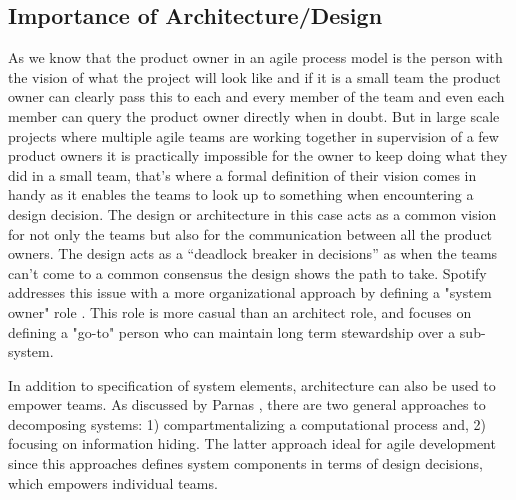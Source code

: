 \subsection{Importance of Architecture/Design}\label{sec:imp_of_dsgn}

As we know that the product owner in an agile process model is the person with the vision of what the project will look like and if it is a small team the product owner can clearly pass this to each and every member of the team and even each member can query the product owner directly when in doubt.
But in large scale projects where multiple agile teams are working together in supervision of a few product owners it is practically impossible for the owner to keep doing what they did in a small team, that’s where a formal definition of their vision comes in handy as it enables the teams to look up to something when encountering a design decision.
The design or architecture in this case acts as a common vision for not only the teams but also for the communication between all the product owners.
The design acts as a “deadlock breaker in decisions” \cite{architecureRole_article} as when the teams can’t come to a common consensus the design shows the path to take.
Spotify addresses this issue with a more organizational approach by defining a "system owner" role \cite{kniberg12}.
This role is more casual than an architect role, and focuses on defining a "go-to" person who can maintain long term stewardship over a sub-system. 

In addition to specification of system elements, architecture can also be used to empower teams.
As discussed by Parnas \cite{Parnas72}, there are two general approaches to decomposing systems: 1) compartmentalizing a computational process and, 2) focusing on information hiding.
The latter approach ideal for agile development since this approaches defines system components in terms of design decisions, which empowers individual teams.